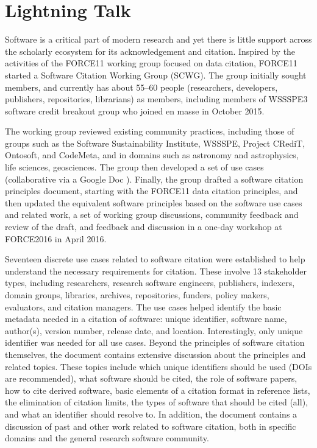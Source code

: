 \documentclass[conference]{IEEEtran}
\begin{document}
\section{Lightning Talk}
Software is a critical part of modern research and yet there is little support across the scholarly ecosystem for its acknowledgement and citation. Inspired by the activities of the FORCE11 working group focused on data citation, FORCE11 started a Software Citation Working Group (SCWG). The group initially sought members, and currently has about 55--60 people (researchers, developers, publishers, repositories, librarians) as members, including members of WSSSPE3 software credit breakout group who joined en masse in October 2015.

The working group reviewed existing community practices, including those of groups such as the Software Sustainability Institute, WSSSPE, Project CRediT, Ontosoft, and CodeMeta, and in domains such as astronomy and astrophysics, life sciences, geosciences. The group then developed a set of use cases (collaborative via a Google Doc \cite{bib1}). Finally, the group drafted a software citation principles document, starting with the FORCE11 data citation principles, and then updated the equivalent software principles based on the software use cases and related work, a set of working group discussions, community feedback and review of the draft, and feedback and discussion in a one-day workshop at FORCE2016 in April 2016.

Seventeen discrete use cases related to software citation were established to help understand the necessary requirements for citation. These involve 13 stakeholder types, including researchers, research software engineers, publishers, indexers, domain groups, libraries, archives, repositories, funders, policy makers, evaluators, and citation managers. The use cases helped identify the basic metadata needed in a citation of software: unique identifier, software name, author(s), version number, release date, and location. Interestingly, only unique identifier was needed for all use cases.
Beyond the principles of software citation themselves, the document contains extensive discussion about the principles and related topics. These topics include which unique identifiers should be used (DOIs are recommended), what software should be cited, the role of software papers, how to cite derived software, basic elements of a citation format in reference lists, the elimination of citation limits, the types of software that should be cited (all), and what an identifier should resolve to. In addition, the document contains a discussion of past and other work related to software citation, both in specific domains and the general research software community.
\end{document}
